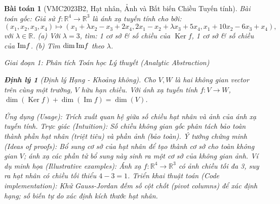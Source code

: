 \documentclass{article}
\newtheorem{baitoan}{Bài toán}
\newtheorem{dinhly}{Định lý}
\begin{document}
\begin{baitoan}[VMC2023B2, Hạt nhân, Ảnh và Bất biến Chiều Tuyến tính]
 \emph{Bài toán gốc:} 
 Giả sử $f:\mathbb{R}^4\to\mathbb{R}^3$ là ánh xạ tuyến tính cho bởi:
 \begin{equation*}
 (x_1,x_2,x_3,x_4)\mapsto(x_1 + \lambda x_2 - x_3 + 2x_4,2x_1 - x_2 + \lambda x_3 + 5x_4,x_1 + 10x_2 - 6x_3 + x_4),
 \end{equation*}
 với $\lambda\in\mathbb{R}$.
 (a) Với $\lambda = 3$, tìm: 1 cơ sở \& số chiều của $\operatorname{Ker}f$, 1 cơ sở \& số chiều của ${\rm Im}f$.
 (b) Tìm $\dim{\rm Im}f$ theo $\lambda$.

\vspace{0.5em}\noindent\emph{Giai đoạn 1: Phân tích Toán học Lý thuyết (Analytic Abstraction)}
 
\begin{dinhly}[Định lý Hạng - Khoảng không]\label{thm:dinh_ly_hang_khoang_khong}
Cho $V, W$ là hai không gian vector trên cùng một trường, $V$ hữu hạn chiều. Với ánh xạ tuyến tính $f: V \to W$, $\dim(\operatorname{Ker}f) + \dim(\operatorname{Im}f) = \dim(V)$.
\end{dinhly}
\emph{Ứng dụng (Usage):} Trích xuất quan hệ giữa số chiều hạt nhân và ảnh của ánh xạ tuyến tính.
\emph{Trực giác (Intuition):} Số chiều không gian gốc phân tách bảo toàn thành phần hạt nhân (triệt tiêu) và phần ảnh (bảo toàn).
\emph{Ý tưởng chứng minh (Ideas of proofs):} Bổ sung cơ sở của hạt nhân để tạo thành cơ sở cho toàn không gian $V$; ánh xạ các phần tử bổ sung này sinh ra một cơ sở của không gian ảnh.
\emph{Ví dụ minh họa (Illustrative examples):} Ánh xạ $f: \mathbb{R}^4 \to \mathbb{R}^3$ có ảnh chiều tối đa 3, suy ra hạt nhân có chiều tối thiểu $4 - 3 = 1$.
\emph{Triển khai thuật toán (Code implementation):} Khử Gauss-Jordan đếm số cột chốt (pivot columns) để xác định hạng; số biến tự do xác định kích thước hạt nhân.


\end{baitoan}
\end{document}
